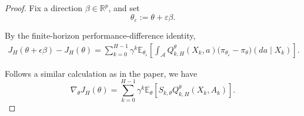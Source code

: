 \documentclass{article}
\theoremstyle{definition}
\theoremstyle{remark}
\theoremstyle{mystyle}
\newcommand{\E}{\mathbb{E}}
\newcommand{\1}{\mathbbm{1}}
\begin{document}
\begin{proof}
Fix a direction \(\beta\in\mathbb R^p\), and set
\[
\theta_\varepsilon
:=
\theta+\varepsilon\beta.
\]

By the finite-horizon performance-difference identity,
\[
\begin{aligned}
J_H(\theta+\epsilon \beta)-J_H(\theta)
=
\sum_{k=0}^{H-1}
\gamma^k
\mathbb E_{\theta_\varepsilon}
\left[
\int_{\mathcal A}
Q_{k,H}^{\theta}(X_k,a)
\bigl(
\pi_{\theta_\varepsilon}
-
\pi_\theta
\bigr)(da\mid X_k)
\right].
\end{aligned}
\tag{1}
\]





Follows a similar calculation as in the paper, we have 
\[
\nabla_\theta J_H(\theta)
=
\sum_{k=0}^{H-1}
\gamma^k
\mathbb E_\theta
\left[
S_{k,\theta}
Q_{k,H}^{\theta}(X_k,A_k)
\right].
\tag{3}
\]


\end{proof}
\end{document}
